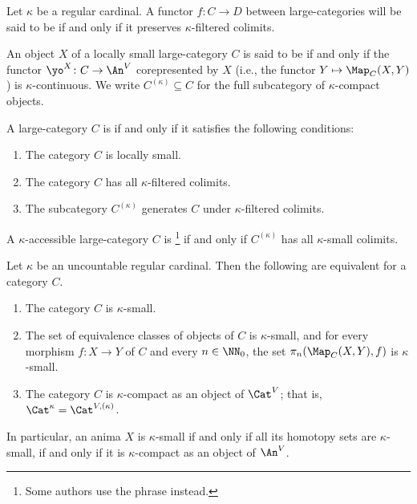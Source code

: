 \begin{definition}
	Let $ \kappa $ be a regular cardinal.
	A functor $ f \colon C \to D $ between large-categories
	will be said to be 
	if and only if it preserves $ \kappa $-filtered colimits.
	
	An object $ X $ of a locally small large-category $ C $
	is said to be  if and only if
	the functor $ \yo^X \colon C \to \An^V$ corepresented by $ X $
	(i.e., the functor $ Y \mapsto \Map_C(X,Y) $)
	is $ \kappa $-continuous.
	We write $ C^{(\kappa)} \subseteq C $
	for the full subcategory of $ \kappa $-compact objects.

	A large-category $C$ is  if and only if
	it satisfies the following conditions:
	\begin{enumerate}
		\item The category $ C $
			is locally small.
		\item The category $ C $
			has all $ \kappa $-filtered colimits.
		\item The subcategory $ C ^{(\kappa)} $ generates $ C $
			under $ \kappa $-filtered colimits.
	\end{enumerate}
	
	A $ \kappa $-accessible large-category $C$ is
	\footnote{Some authors use the phrase
		 instead.}
	if and only if $ C^{(\kappa)} $
	has all $ \kappa $-small colimits.
\end{definition}

\begin{eg}
	Let $ \kappa $ be an uncountable regular cardinal.
	Then the following are equivalent for a category $ C $.
	\begin{enumerate}
		\item The category $ C $ is $ \kappa $-small.
		\item The set of equivalence classes
			of objects of $C$ is $ \kappa $-small,
			and for every morphism
			$ f \colon X \to Y $ of $ C $
			and every $ n \in \NN_0$,
			the set $ \pi_n(\Map_C(X,Y),f) $ is
			$ \kappa $-small.
		\item The category $ C $ is $ \kappa $-compact
			as an object of $ \Cat^V $;
			that is, $ \Cat^{\kappa} = \Cat^{V,(\kappa)} $.
	\end{enumerate}
	In particular, an anima $ X $ is $ \kappa $-small if and only if
	all its homotopy sets are $ \kappa $-small, if and only if
	it is $ \kappa $-compact as an object of $ \An^V $.
\end{eg}


